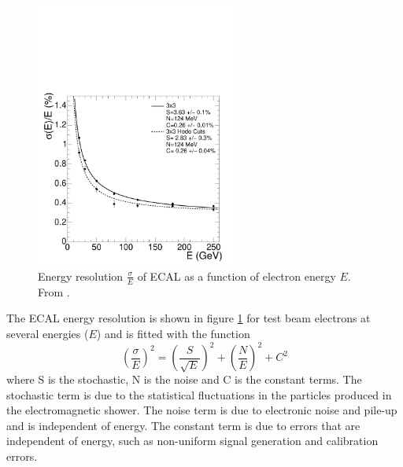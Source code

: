 \begin{figure}[htp]
  \centering
  \includegraphics[width=0.6\textwidth]{ecal_performance}
  \caption{Energy resolution $\frac{\sigma}{E}$ of ECAL as a function of
  \label{fig:ECAL}
electron energy $E$. From \cite{cms}.}
\end{figure}

The ECAL energy resolution is shown in figure \ref{fig:ECAL} for test beam
electrons at several energies ($E$) and is fitted with the function
\begin{equation}
\left(\frac{\sigma}{E}\right)^{2} = \left(\frac{S}{\sqrt{E}}\right)^{2} +
\left(\frac{N}{E}\right)^{2} + C^{2}
\end{equation}
where S is the stochastic, N is the noise and C is the constant terms. The
stochastic term is due to the statistical fluctuations in the particles
produced in the electromagnetic shower. The noise term is due to electronic
noise and pile-up and is independent of energy. The constant term is due to
errors that are independent of energy, such as non-uniform signal generation
and calibration errors.\cite{cms}




